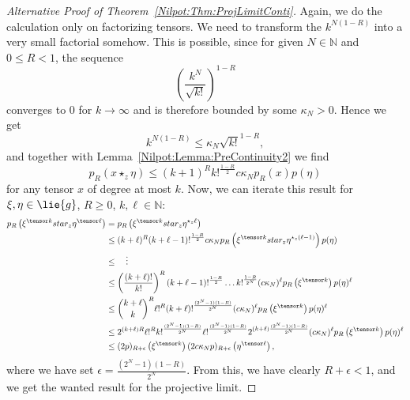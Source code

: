 \begin{proof}[Alternative Proof of Theorem~\ref{Nilpot:Thm:ProjLimitConti}]
	Again, we do the calculation only on factorizing tensors. We need to 
	transform the $k^{N(1-R)}$ into a very small factorial somehow. This is 
	possible, since for given $N \in \mathbb{N}$ and $0 \leq R < 1$, the 
	sequence
	\begin{equation*}
		\left( \frac{k^N}{\sqrt{k!}} \right)^{1-R}
	\end{equation*}
	converges to $0$ for $k \longrightarrow \infty$ and is therefore bounded 
	by some $\kappa_N > 0$. Hence we get
	\begin{equation*}
		k^{ N (1-R) } 
		\leq
		\kappa_N \sqrt{k!}^{1-R},
	\end{equation*}
	and together with Lemma~\ref{Nilpot:Lemma:PreContinuity2} we find
	\begin{equation*}
		p_R \left( x \star_z \eta \right)
		\leq
		(k + 1)^R k!^{\frac{1-R}{2}} c \kappa_N
		p_R (x) p(\eta)
	\end{equation*}
	for any tensor $x$ of degree at most $k$. Now, we can iterate this result
	for $\xi, \eta \in \lie{g}$, $R \geq 0$, $k, \ell \in \mathbb{N}$:
	\begin{align*}
		p_R \left(
			\xi^{\tensor k} star_z \eta^{\tensor \ell}
		\right)
		& =
		p_R \left(
			\xi^{\tensor k} star_z 
			\eta^{\star_z \ell}
		\right)
		\\
		& \leq
		(k + \ell)^R
		(k + \ell - 1)!^{\frac{1-R}{2}}
		c \kappa_N
		p_R \left(
			\xi^{\tensor k} star_z 
			\eta^{\star_z (\ell - 1)}
		\right)
		p(\eta)
		\\
		& \leq
		\quad \vdots
		\\
		& \leq
		\left(
			\frac{(k + \ell)!}{k!}
		\right)^R
		(k + \ell - 1)!^{\frac{1-R}{2}}
		\ldots
		k!^{\frac{1-R}{2^N}}
		(c \kappa_N)^{\ell}
		p_R \left( \xi^{\tensor k} \right)
		p(\eta)^{\ell}
		\\
		& \leq
		\binom{k + \ell}{k}^R 
		\ell!^R
		(k + \ell)!^{\frac{(2^N - 1) (1-R)}{2^N} }
		(c \kappa_N)^{\ell}
		p_R \left( \xi^{\tensor k} \right)
		p(\eta)^{\ell}
		\\
		& \leq
		2^{(k + \ell) R}
		\ell!^R
		k!^{\frac{(2^N - 1) (1-R)}{2^N} }
		\ell!^{\frac{(2^N - 1) (1-R)}{2^N} }
		2^{ (k + \ell) \frac{(2^N - 1) (1-R)}{2^N} }
		(c \kappa_N)^{\ell}
		p_R \left( \xi^{\tensor k} \right)
		p(\eta)^{\ell}
		\\
		& \leq
		(2 p)_{R + \epsilon} 
		\left( \xi^{\tensor k} \right)
		(2 c \kappa_N p)_{R + \epsilon} 
		\left( \eta^{\tensor \ell} \right),
	\end{align*}
	where we have set $\epsilon = \frac{(2^N - 1)(1 - R)}{2^N}$. From this,
	we have clearly $R + \epsilon < 1$, and we get the wanted result for the 
	projective limit.
\end{proof}
